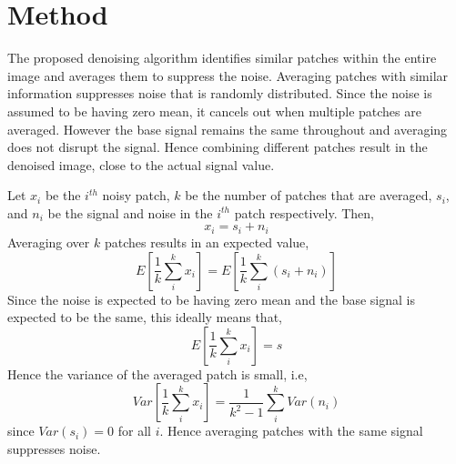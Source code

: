 \documentclass[fleqn,10pt]{wlscirep}
\begin{document}
\section*{Method}

The proposed denoising algorithm identifies similar patches within the entire image and averages them to suppress the noise. Averaging patches with similar information suppresses noise that is randomly distributed. Since the noise is assumed to be having zero mean, it cancels out when multiple patches are averaged. However the base signal remains the same throughout and averaging does not disrupt the signal. Hence combining different patches result in the denoised image, close to the actual signal value. 

Let $x_{i}$ be the $i^{th}$ noisy patch, $k$ be the number of patches that are averaged, $s_i$, and $n_i$ be the signal and noise in the $i^{th}$ patch respectively. Then,
\begin{equation}
	x_i = s_i + n_i
\end{equation}
Averaging over $k$ patches results in an expected value,
\begin{equation}
	E[\frac{1}{k}\sum_{i}^{k}x_i ] = E[\frac{1}{k}\sum_{i}^{k}(s_i + n_i) ]
\end{equation}
Since the noise is expected to be having zero mean and the base signal is expected to be the same, this ideally means that,
\begin{equation}
	E[\frac{1}{k}\sum_{i}^{k}x_i ] = s
\end{equation}
Hence the variance of the averaged patch is small, i.e,
\begin{equation}
	Var[\frac{1}{k}\sum_{i}^{k}x_i ] = \frac{1}{k^2 -1} \sum_{i}^{k}Var(n_i)
\end{equation}
since $Var(s_i) = 0$ for all $i$. Hence averaging patches with the same signal suppresses noise.


\end{document}
